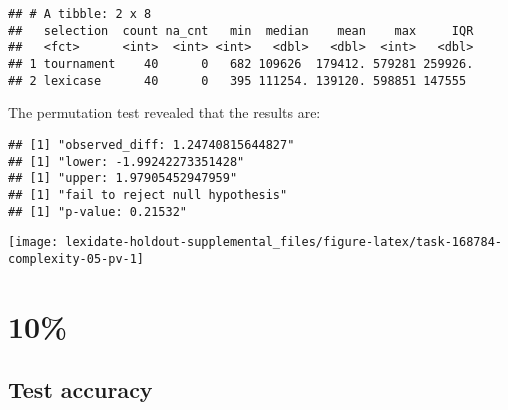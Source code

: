 \documentclass[
]{book}
\newenvironment{Shaded}{\begin{snugshade}}{\end{snugshade}}
\newcommand{\AttributeTok}[1]{\textcolor[rgb]{0.13,0.29,0.53}{#1}}
\newcommand{\DecValTok}[1]{\textcolor[rgb]{0.00,0.00,0.81}{#1}}
\newcommand{\FunctionTok}[1]{\textcolor[rgb]{0.13,0.29,0.53}{\textbf{#1}}}
\newcommand{\NormalTok}[1]{#1}
\newcommand{\OtherTok}[1]{\textcolor[rgb]{0.56,0.35,0.01}{#1}}
\newcommand{\SpecialCharTok}[1]{\textcolor[rgb]{0.81,0.36,0.00}{\textbf{#1}}}
\newcommand{\StringTok}[1]{\textcolor[rgb]{0.31,0.60,0.02}{#1}}
\begin{document}
\begin{verbatim}
## # A tibble: 2 x 8
##   selection  count na_cnt   min  median    mean    max     IQR
##   <fct>      <int>  <int> <int>   <dbl>   <dbl>  <int>   <dbl>
## 1 tournament    40      0   682 109626  179412. 579281 259926.
## 2 lexicase      40      0   395 111254. 139120. 598851 147555
\end{verbatim}

The permutation test revealed that the results are:

\begin{Shaded}
\end{Shaded}

\begin{verbatim}
## [1] "observed_diff: 1.24740815644827"
## [1] "lower: -1.99242273351428"
## [1] "upper: 1.97905452947959"
## [1] "fail to reject null hypothesis"
## [1] "p-value: 0.21532"
\end{verbatim}

\texttt{[image: lexidate-holdout-supplemental\_files/figure-latex/task-168784-complexity-05-pv-1]}

\hypertarget{section-51}{%
\section{10\%}\label{section-51}}

\hypertarget{test-accuracy-51}{%
\subsection{Test accuracy}\label{test-accuracy-51}}
\end{document}
